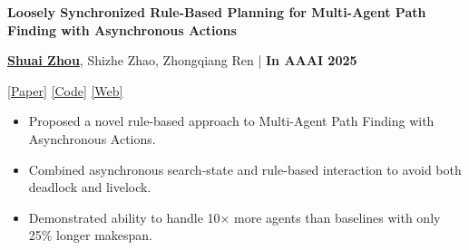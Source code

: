\documentclass[a4paper,9pt]{extarticle}
\begin{document}
\par\textbf{Loosely Synchronized Rule-Based Planning for
Multi-Agent Path Finding with Asynchronous Actions}
\par\textup{\underline{\textbf{Shuai Zhou}}, Shizhe Zhao, Zhongqiang Ren   \hfill | \textbf{In AAAI 2025}}  %
\par\textup{\textbar{} \href{https://doi.org/10.1609/aaai.v39i14.33618}{[Paper]}  \textbar{} \href{https://github.com/rap-lab-org/public_LSRP}{[Code]}  \textbar{} \href{https://rap-lab.github.io/research/mapfaa}{[Web]} \textbar{}}
\begin{itemize}
    \item  Proposed a novel rule-based approach to Multi-Agent Path Finding with Asynchronous Actions.
    \item Combined asynchronous search-state and rule-based interaction to avoid both deadlock and livelock.
    \item Demonstrated ability to handle 10× more agents than baselines with only 25\% longer makespan.
\end{itemize}
\end{document}
